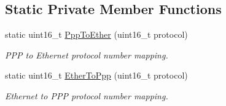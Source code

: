 \subsection*{Static Private Member Functions}
\begin{DoxyCompactItemize}
\item 
static uint16\+\_\+t \hyperlink{classns3_1_1PointToPointNetDevice_a9863e8e616347267156c0de2cdace3cd}{Ppp\+To\+Ether} (uint16\+\_\+t protocol)
\begin{DoxyCompactList}\small\item\em P\+PP to Ethernet protocol number mapping. \end{DoxyCompactList}\item 
static uint16\+\_\+t \hyperlink{classns3_1_1PointToPointNetDevice_a597eb43fcf326b367f78ca09f4d2bdff}{Ether\+To\+Ppp} (uint16\+\_\+t protocol)
\begin{DoxyCompactList}\small\item\em Ethernet to P\+PP protocol number mapping. \end{DoxyCompactList}\end{DoxyCompactItemize}
